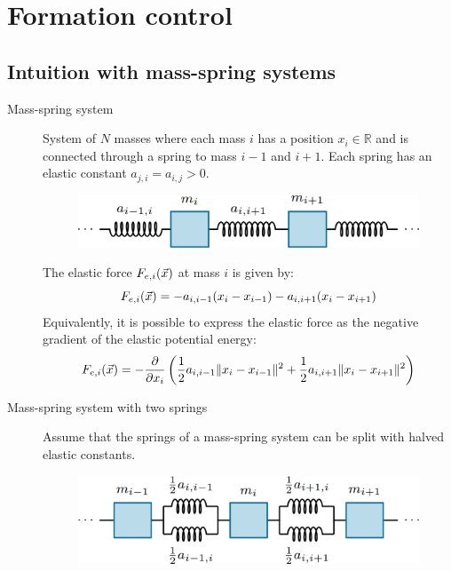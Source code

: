 \chapter{Formation control}


\section{Intuition with mass-spring systems}

\begin{description}
    \item[Mass-spring system] 
        System of $N$ masses where each mass $i$ has a position $x_i \in \mathbb{R}$ and is connected through a spring to mass $i-1$ and $i+1$. Each spring has an elastic constant $a_{j, i} = a_{i, j} > 0$.

        \begin{figure}[H]
            \centering
            \includegraphics[width=0.35\linewidth]{./img/mass_spring_system.png}
        \end{figure}

        The elastic force $F_{e,i}({\vec{x}})$ at mass $i$ is given by:
        \[
            F_{e,i}({\vec{x}}) = -a_{i,i-1}(x_i-x_{i-1}) - a_{i,i+1}(x_i - x_{i+1})
        \]
        Equivalently, it is possible to express the elastic force as the negative gradient of the elastic potential energy:
        \[
            F_{e,i}({\vec{x}}) = -\frac{\partial}{\partial x_i}\left( \frac{1}{2} a_{i,i-1} \Vert x_i - x_{i-1} \Vert^2 + \frac{1}{2} a_{i,i+1} \Vert x_i - x_{i+1} \Vert^2 \right)
        \]

    \item[Mass-spring system with two springs] 
        Assume that the springs of a mass-spring system can be split with halved elastic constants.
        \begin{figure}[H]
            \centering
            \includegraphics[width=0.35\linewidth]{./img/mass_spring_system2.png}
        \end{figure}


\end{description}
